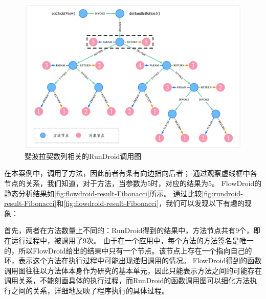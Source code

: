 \begin{figure}[!hb]
	\centering
	\includegraphics[width=\textwidth]{./Figures/doFibonacci-rundroid.png}
	\caption{斐波拉契数列相关的RunDroid调用图}
	\label{fig:rundroid-result-Fibonacci}
\end{figure}
在本案例中，调用了方法，因此前者有条有向边指向后者；
通过观察虚线框中各节点的关系，我们知道，对于方法，当参数为5时，对应的结果为5。
FlowDroid的静态分析结果如\autoref{fig:flowdroid-result-Fibonacci}所示。
通过比较\autoref{fig:rundroid-result-Fibonacci}和\autoref{fig:flowdroid-result-Fibonacci}，我们可以发现以下有趣的现象：


首先，两者在方法数量上不同的：RunDroid得到的结果中，方法节点共有9个，即在运行过程中，被调用了9次。
由于在一个应用中，每个方法的方法签名是唯一的，所以FlowDroid给出的结果中只有一个节点。该节点上存在一个指向自己的环，表示这个方法在执行过程中可能出现递归调用的情况。
FlowDroid得到的函数调用图往往以方法体本身作为研究的基本单元，因此只能表示方法之间的可能存在调用关系，不能刻画具体的执行过程，而RunDroid的函数调用图可以细化方法执行之间的关系，详细地反映了程序执行的具体过程。




